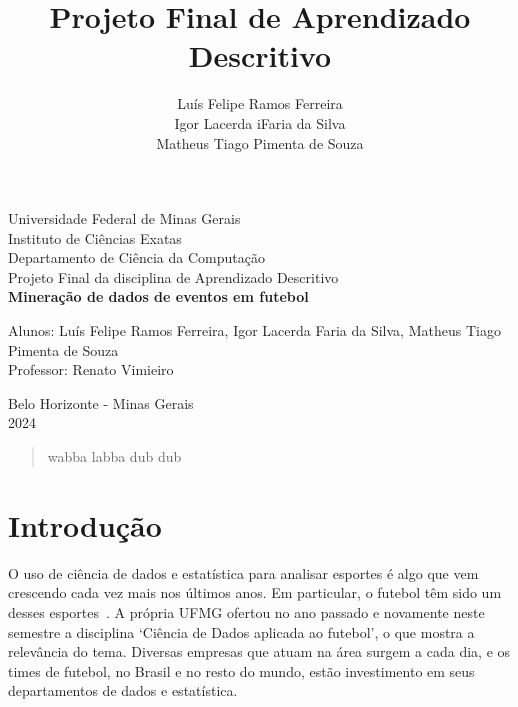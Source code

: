 \documentclass{article}
\begin{document}
\begin{titlepage}
    \begin{center}
        {\large Universidade Federal de Minas Gerais}\\[0.2cm]
        {\large Instituto de Ciências Exatas}\\[0.2cm]
        {\large Departamento de Ciência da Computação}\\[0.2cm]
        {\large Projeto Final da disciplina de Aprendizado Descritivo}\\[5.1cm]
        {\large \bf Mineração de dados de eventos em futebol}\\[5.1cm]
    \end{center}
    {\large Alunos: Luís Felipe Ramos Ferreira, Igor Lacerda Faria da Silva, Matheus Tiago Pimenta de Souza}\\[0.7cm]
    {\large Professor: Renato Vimieiro}\\[5.1cm]
    \begin{center}
        {\large Belo Horizonte - Minas Gerais}\\[0.2cm]
        {\large 2024}
    \end{center}
\end{titlepage}

\newpage
\begin{quote}
    wabba labba dub dub
\end{quote}

\newpage
\renewcommand{\contentsname}{Sumário}
\tableofcontents
\newpage

\title{Projeto Final de Aprendizado Descritivo}
\author{Luís Felipe Ramos Ferreira \\  Igor Lacerda iFaria da Silva \\ Matheus
    Tiago Pimenta de Souza}

\maketitle

\section{Introdução}

O uso de ciência de dados e estatística para analisar esportes é algo que vem
crescendo cada vez mais nos últimos anos. Em
particular, o futebol têm sido um desses
esportes~\cite{takvorian2021beautiful}. A própria UFMG ofertou no
ano passado e novamente neste semestre a disciplina `Ciência de Dados aplicada
ao futebol', o que mostra a relevância do tema. Diversas empresas que atuam na
área surgem a cada dia, e os times de futebol, no Brasil e no resto do
mundo, estão investimento em seus departamentos de dados e estatística.
\end{document}
